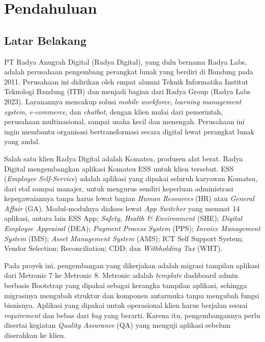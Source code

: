 \chapter{Pendahuluan}

\section{Latar Belakang}
PT Radya Anugrah Digital (Radya Digital), yang dulu bernama Radya Labs, adalah perusahaan pengembang perangkat lunak yang berdiri di Bandung pada 2011. Perusahaan ini didirikan oleh empat alumni Teknik Informatika Institut Teknologi Bandung\label{ist:itb} (ITB) dan menjadi bagian dari Radya Group (Radya Labs 2023). Layanannya mencakup solusi \textit{mobile workforce}, \textit{learning management system}, \textit{e-commerce}, dan \textit{chatbot}, dengan klien mulai dari pemerintah, perusahaan multinasional, sampai usaha kecil dan menengah. Perusahaan ini ingin membantu organisasi bertransformasi secara digital lewat perangkat lunak yang andal.

Salah satu klien Radya Digital adalah Komatsu, produsen alat berat. Radya Digital mengembangkan aplikasi Komatsu ESS\label{ist:ess} untuk klien tersebut. ESS (\textit{Employee Self-Service}) adalah aplikasi yang dipakai seluruh karyawan Komatsu, dari staf sampai manajer, untuk mengurus sendiri keperluan administrasi kepegawaiannya tanpa harus lewat bagian \textit{Human Resources}\label{ist:hr} (HR) atau \textit{General Affair}\label{ist:ga} (GA). Modul-modulnya diakses lewat \textit{App Switcher} yang memuat 14 aplikasi, antara lain ESS App; \textit{Safety, Health \& Environment}\label{ist:she} (SHE); \textit{Digital Employee Appraisal}\label{ist:dea} (DEA); \textit{Payment Process System}\label{ist:pps} (PPS); \textit{Invoice Management System}\label{ist:ims} (IMS); \textit{Asset Management System}\label{ist:ams} (AMS); ICT Self Support System\label{ist:ict}; Vendor Selection; Reconciliation; CDD; dan \textit{Withholding Tax}\label{ist:wht} (WHT).

Pada proyek ini, pengembangan yang dikerjakan adalah migrasi tampilan aplikasi dari Metronic 7 ke Metronic 8. Metronic adalah \textit{template} dashboard admin berbasis Bootstrap yang dipakai sebagai kerangka tampilan aplikasi, sehingga migrasinya mengubah struktur dan komponen antarmuka tanpa mengubah fungsi bisnisnya. Aplikasi yang dipakai untuk operasional klien harus berjalan sesuai \textit{requirement} dan bebas dari \textit{bug} yang berarti. Karena itu, pengembangannya perlu disertai kegiatan \textit{Quality Assurance}\label{ist:qa} (QA) yang menguji aplikasi sebelum diserahkan ke klien.

